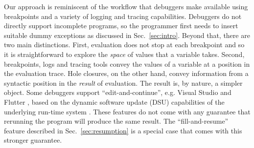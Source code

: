 
Our approach is reminiscent of the workflow that debuggers make available using breakpoints \cite{fitzgerald2008debugging,DBLP:journals/jfp/TolmachA95} and a variety of logging and tracing capabilities.
%
Debuggers do not directly support incomplete programs, so the programmer first needs to insert suitable dummy exceptions as discussed in Sec.~\ref{sec:intro}.
%
Beyond that, there are two main distinctions. First, evaluation does not stop at each breakpoint and so it is straightforward to explore the \emph{space} of values that a variable takes. Second, breakpoints, logs and tracing tools convey the values of a variable at a position in the evaluation trace. Hole closures, on the other hand, convey information from a syntactic position in the \emph{result} of evaluation. The result is, by nature, a simpler object.%
Some debuggers support ``edit-and-continue'', e.g. Visual Studio \cite{VSEditAndContinue} and Flutter \cite{flutter}, based on the dynamic software update (DSU) capabilities of the underlying run-time system \cite{DBLP:journals/toplas/StoyleHBSN07,DBLP:conf/vstte/HaydenMHFF12,DBLP:journals/toplas/HicksN05}. These features do not come with any guarantee that rerunning the program will produce the same result. The ``fill-and-resume'' feature described in Sec.~\ref{sec:resumption} is a special case that comes with this stronger guarantee.

